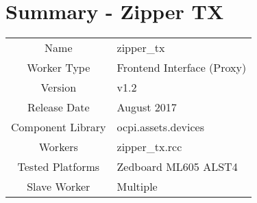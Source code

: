 \documentclass{article}
\author{} %
\date{Version \docVersion} %
\title{\docTitle}
\def\docVersion{1.2}
\def\comp{zipper\_tx}
\def\Comp{Zipper TX}
\begin{document}
\section*{Summary - \Comp}
\begin{tabular}{|c|M{13.5cm}|}
	\hline
	                  &                                        \\
	\hline
	Name              & \comp                                  \\
	\hline
	Worker Type       & Frontend Interface (Proxy)             \\
	\hline
	Version           & v\docVersion \\
	\hline
	Release Date      & August 2017 \\
	\hline
	Component Library & ocpi.assets.devices \\
	\hline
	Workers           & zipper\_tx.rcc                      \\
	\hline
	Tested Platforms  & Zedboard ML605 ALST4                           \\
	\hline
	Slave Worker      & Multiple                               \\
	\hline
\end{tabular}
\end{document}
